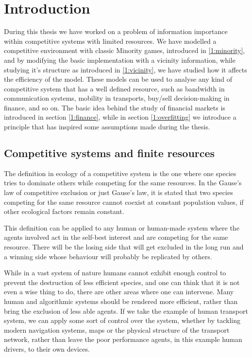 \chapter{Introduction}

During this thesis we have worked on a problem of information importance within competitive systems with limited resources. 
We have modelled a competitive environment with classic Minority games, introduced in \ref{1:minority}, and by modifying the basic implementation with a vicinity information, while studying it's structure as introduced in \ref{1:vicinity}, we have studied how it affects the efficiency of the model.
These models can be used to analyse any kind of competitive system that has a well defined resource, such as bandwidth in communication systems, mobility in transports, buy/sell decision-making in finance, and so on.
The basic idea behind the study of financial markets is introduced in section \ref{1:finance}, while in section \ref{1:overfitting} we introduce a principle that has inspired some assumptions made during the thesis.

\section{Competitive systems and finite resources}
The definition in ecology of a competitive system is the one where one species tries to dominate others while competing for the same resources. 
In the Gause's law of competitive exclusion or just Gause's law, \cite{gause1936struggle} it is stated that two species competing for the same resource cannot coexist at constant population values, if other ecological factors remain constant. 

This definition can be applied to any human or human-made system where the agents involved act in the self-best interest and are competing for the same resource.
There will be the losing side that will get excluded in the long run and a winning side whose behaviour will probably be replicated by others.

While in a vast system of nature humans cannot exhibit enough control to prevent the destruction of less efficient species, and one can think that it is not even a wise thing to do, there are other areas where one can intervene.
Many human and algorithmic systems should be rendered more efficient, rather than bring the exclusion of less able agents.
If we take the example of human transport system, we can apply some sort of control over the system, whether by tackling modern navigation systems, maps or the physical structure of the transport network, rather than leave the poor performance agents, in this example human drivers, to their own devices.
	

